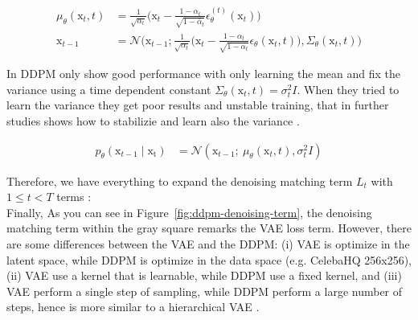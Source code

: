 \begin{align}\label{eqn:backward-noise-reparameterization}
    \mu_{\theta}(\mathrm{x}_{t}, t) &= \frac{1}{\sqrt{\alpha_{t}}}\big(\mathrm{x}_{t} - \frac{1-\alpha_{t}}{\sqrt{1-\bar{\alpha}_{t}}}\epsilon_{\theta}^{(t)}(\mathrm{x}_{t})\big) \\
    \mathrm{x}_{t-1} &= \mathcal{N}\big(\mathrm{x}_{t-1}; \frac{1}{\sqrt{\alpha_{t}}}\big(\mathrm{x}_{t} - \frac{1-\alpha_{t}}{\sqrt{1-\bar{\alpha}_{t}}}\epsilon_{\theta}(\mathrm{x}_{t}, t)\big), \Sigma_{\theta}(\mathrm{x}_{t}, t)\big)
\end{align}


\noindent In DDPM only show good performance with only learning the mean
and fix the variance using a time dependent constant $\Sigma_{\theta}(\mathrm{x}_{t}, t) = \sigma_{t}^{2}I$. When they tried to learn the variance they get poor results and unstable training, that in further studies shows how to stabilizie and learn also the variance \citep{nichol2021improved}.

\begin{align}\label{eqn:backward-process-fix-variance}
    p_{\theta}(\mathrm{x}_{t-1}\mid\mathrm{x_{t}}) &= \mathcal{N}(\mathrm{x}_{t-1};~\mu_{\theta}(\mathrm{x}_{t}, t), \sigma_{t}^{2}I)
\end{align}

Therefore, we have everything to expand the denoising matching term $L_t$ with $1\leq t < T$ terms : \\



\noindent {} Finally, As you can see in Figure~\ref{fig:ddpm-denoising-term}, the denoising matching term within the gray square remarks the VAE loss term. However, there are some differences between the VAE and the DDPM: (i) VAE is optimize in the latent space, while DDPM is optimize in the data space (e.g. CelebaHQ 256x256), (ii) VAE use a kernel that is learnable, while DDPM use a fixed kernel, and (iii) VAE perform a single step of sampling, while DDPM perform a large number of steps, hence is more similar to a hierarchical VAE \citep{luo2022understanding}.\\


